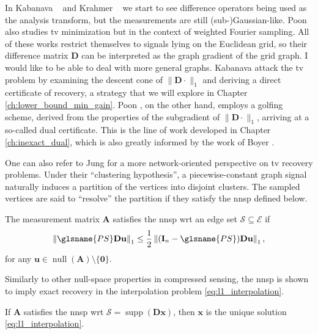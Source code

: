 In Kabanava \etal~\cite{kabanava2015a} and Krahmer \etal~\cite{krahmer2017} we start to see difference operators being used as the analysis transform, but the measurements are still (sub-)Gaussian-like. Poon \cite{poon2015} also studies \acrlong{tv} minimization but in the context of weighted Fourier sampling. All of these works restrict themselves to signals lying on the Euclidean grid, so their difference matrix $\mathbf{D}$ can be interpreted as the graph gradient of the grid graph. I would like to be able to deal with more general graphs. Kabanava \etal \cite{kabanava2015a} attack the \acrlong{tv} problem by examining the descent cone of $\|\mathbf{D} \cdot\|_1$ and deriving a direct certificate of recovery, a strategy that we will explore in Chapter \ref{ch:lower_bound_min_gain}. Poon \cite{poon2015}, on the other hand, employs a golfing scheme, derived from the properties of the subgradient of $\|\mathbf{D} \cdot\|_1$, arriving at a so-called dual certificate. This is the line of work developed in Chapter \ref{ch:inexact_dual}, which is also greatly informed by the work of Boyer \etal \cite{boyer2019}.

One can also refer to Jung \etal \cite{jung2016, jung2017, jung2018} for a more network-oriented perspective on \acrlong{tv} recovery problems. Under their ``clustering hypothesis'', a piecewise-constant graph signal naturally induces a partition of the vertices into disjoint clusters. The sampled vertices are said to ``resolve'' the partition if they satisfy the \acrlong{nnsp} defined below.

\begin{definition}
    The measurement matrix $\mathbf{A}$ satisfies the \acrshort{nnsp} \acrlong{wrt} an edge set $\mathcal{S} \subseteq \mathcal{E}$ if
    \begin{equation}
        \left \| \glsname{PS} \mathbf{D u} \right \|_1 \leq \frac{1}{2} \left \| (\mathbf{I}_n - \glsname{PS}) \mathbf{D u} \right \|_1,
    \end{equation}
    for any $\mathbf{u} \in \operatorname{null} \left ( \mathbf{A} \right ) \setminus \{ \mathbf{0} \}$.
\end{definition}

Similarly to other null-space properties in compressed sensing, the \acrshort{nnsp} is shown to imply exact recovery in the interpolation problem \eqref{eq:l1_interpolation}.

\begin{proposition}
    If $\mathbf{A}$ satisfies the \acrshort{nnsp} \acrshort{wrt} $\mathcal{S} = \operatorname{supp}\left ( \mathbf{D x} \right )$, then $\mathbf{x}$ is the unique solution \eqref{eq:l1_interpolation}.
\end{proposition}


